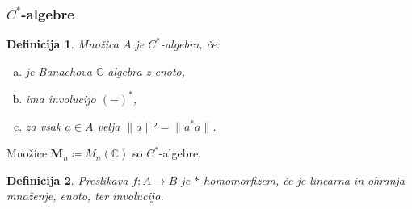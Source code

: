 \documentclass[slovene]{beamer}
\newtheorem{trditev}[theorem]{Trditev}
\newtheorem{definicija}{Definicija}
{\theoremstyle{example}
    \newtheorem{zgled}{Zgled}
    \newtheorem{primer}{Primer}
    \newtheorem{primeri}{Primeri}
}
\newcommand{\M}[1][]{\mathbf{M}_{#1}}
\newcommand{\sequent}[3]{#1 \mid #2 ⊢ #3}
\newcommand{\sem}[1]{\left⟦ #1 \right⟧}
\newcommand{\semmap}[2]{%
  \def\nextitem{\def\nextitem{⊕}}%
  \forcsvlist\semmapitem{#2} → \M[\IfInteger{#1}{\FPeval\result{round(2^(#1):0)}\result}{2^{#1}}]
}
\newcommand{\semmapitem}[1]{%
  \nextitem
  \def\param{\detokenize{#1}}%
  \if\param…%
    ⋯%
  \else%
    \M[\IfInteger{\param}{\FPeval\result{round(2^(\param):0)}\result}{2^{\param}}]\!%
  \fi
}
\begin{document}
\begin{frame}
    \frametitle{\(C^*\)-algebre}

    \begin{definicija}
        Množica \(A\) je \(C^*\)-algebra, če:
        \begin{enumerate}[(a)]
            \item je Banachova \(ℂ\)-algebra z enoto,
            \item ima involucijo \((-)^*\),
            \item za vsak \(a ∈ A\) velja \(\|a\|² = \|a^*a\|\).
        \end{enumerate}
    \end{definicija}

    \begin{primer}
        Množice \(\M[n] ≔ M_{n}(ℂ)\) so \(C^*\)-algebre.
    \end{primer}


    \begin{definicija}
        Preslikava \(f : A → B\) je \(*\)-homomorfizem, če je linearna in ohranja množenje, enoto, ter involucijo.
    \end{definicija}

\end{frame}




\end{document}
